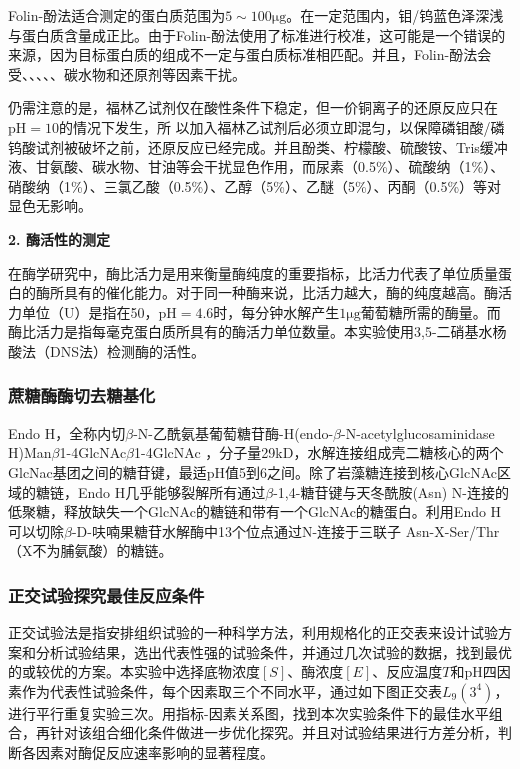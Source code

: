 Folin-酚法适合测定的蛋白质范围为$5\sim100 \mathrm{μg}$。在一定范围内，钼/钨蓝色泽深浅与蛋白质含量成正比。由于Folin-酚法使用了标准进行校准，这可能是一个错误的来源，因为目标蛋白质的组成不一定与蛋白质标准相匹配。并且，Folin-酚法会受、、、、、碳水物和还原剂等因素干扰。

仍需注意的是，福林乙试剂仅在酸性条件下稳定，但一价铜离子的还原反应只在$\mathrm{pH}=10$的情况下发生，所
以加入福林乙试剂后必须立即混匀，以保障磷钼酸/磷钨酸试剂被破坏之前，还原反应已经完成。并且酚类、柠檬酸、硫酸铵、Tris缓冲液、甘氨酸、碳水物、甘油等会干扰显色作用，而尿素（0.5\%）、硫酸纳（1\%）、硝酸纳（1\%）、三氯乙酸（0.5\%）、乙醇（5\%）、乙醚（5\%）、丙酮（0.5\%）等对显色无影响。

 \noindent \textbf {2. 酶活性的测定}
 
在酶学研究中，酶比活力是用来衡量酶纯度的重要指标，比活力代表了单位质量蛋白的酶所具有的催化能力。对于同一种酶来说，比活力越大，酶的纯度越高。酶活力单位（U）是指在50\dc，$\mathrm{pH}=4.6$时，每分钟水解产生$1\mathrm{μg}$葡萄糖所需的酶量。而酶比活力是指每毫克蛋白质所具有的酶活力单位数量。本实验使用3,5-二硝基水杨酸法（DNS法）检测酶的活性。

\subsubsection{蔗糖酶酶切去糖基化}
\par Endo H，全称内切$\beta$-N-乙酰氨基葡萄糖苷酶-H(endo-$\beta$-N-acetylglucosaminidase H)Man$\beta$1-4GlcNAc$\beta$1-4GlcNAc ，分子量29kD，水解连接组成壳二糖核心的两个GlcNac基团之间的糖苷键，最适pH值5到6之间。除了岩藻糖连接到核心GlcNAc区域的糖链，Endo H几乎能够裂解所有通过$\beta$-1,4-糖苷键与天冬酰胺(Asn) N-连接的低聚糖，释放缺失一个GlcNAc的糖链和带有一个GlcNAc的糖蛋白。利用Endo H可以切除$\beta$-D-呋喃果糖苷水解酶中13个位点通过N-连接于三联子 Asn-X-Ser/Thr（X不为脯氨酸）的糖链。 
\subsubsection{正交试验探究最佳反应条件}
\par 正交试验法是指安排组织试验的一种科学方法，利用规格化的正交表来设计试验方案和分析试验结果，选出代表性强的试验条件，并通过几次试验的数据，找到最优的或较优的方案。本实验中选择底物浓度$[S]$、酶浓度$[E]$、反应温度$T$和$\mathrm{pH}$四因素作为代表性试验条件，每个因素取三个不同水平，通过如下图正交表$L_9(3^4)$，进行平行重复实验三次。用指标-因素关系图，找到本次实验条件下的最佳水平组合，再针对该组合细化条件做进一步优化探究。并且对试验结果进行方差分析，判断各因素对酶促反应速率影响的显著程度。
